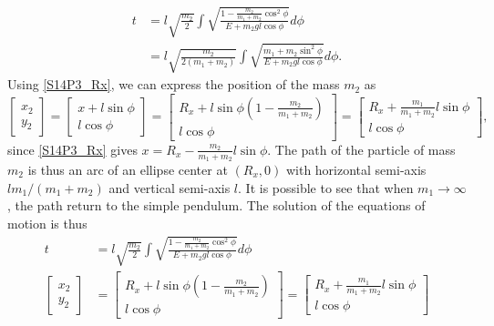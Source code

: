 \begin{problem}[title={Integrating the sliding-support pendulum}]
{\begin{align*}
    t &= l\sqrt{\frac{m_2}{2}}\int\sqrt{\frac{1-\frac{m_2}{m_1+m_2}\cos^2{\phi}}{E+m_2gl\cos{\phi}}}d\phi \\
    &= l\sqrt{\frac{m_2}{2(m_1+m_2)}}\int\sqrt{\frac{m_1+m_2\sin^2{\phi}}{E+m_2gl\cos{\phi}}}d\phi.
\end{align*}
Using \eqref{S14P3_Rx}, we can express the position of the mass $m_2$ as
\begin{equation*}
    \begin{bmatrix} x_2 \\ y_2 \end{bmatrix} = \begin{bmatrix} x + l\sin{\phi} \\ l\cos{\phi} \end{bmatrix}=\begin{bmatrix} R_x + l\sin{\phi}\left(1 - \frac{m_2}{m_1+m_2} \right) \\ l\cos{\phi} \end{bmatrix} = \begin{bmatrix} R_x + \frac{m_1}{m_1+m_2}l\sin{\phi} \\ l\cos{\phi} \end{bmatrix},
\end{equation*}
since \eqref{S14P3_Rx} gives $x = R_x - \frac{m_2}{m_1+m_2}l\sin{\phi}$.
The path of the particle of mass $m_2$ is thus an arc of an ellipse center at $(R_x,0)$ with horizontal semi-axis $lm_1/(m_1+m_2)$ and vertical semi-axis $l$. It is possible to see that when $m_1 \rightarrow \infty$, the path return to the simple pendulum. The solution of the equations of motion is thus
}
{
\begin{align*}
  t &= l\sqrt{\frac{m_2}{2}}\int\sqrt{\frac{1-\frac{m_2}{m_1+m_2}\cos^2{\phi}}{E+m_2gl\cos{\phi}}}d\phi \\
  \begin{bmatrix} x_2 \\ y_2 \end{bmatrix} &= \begin{bmatrix} R_x + l\sin{\phi}\left(1 - \frac{m_2}{m_1+m_2} \right) \\ l\cos{\phi} \end{bmatrix} = \begin{bmatrix} R_x + \frac{m_1}{m_1+m_2}l\sin{\phi} \\ l\cos{\phi} \end{bmatrix}
\end{align*}
}
\end{problem}

